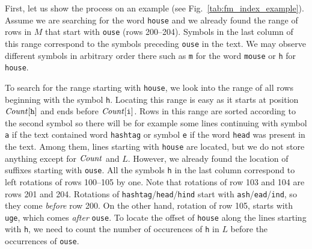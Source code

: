 First, let us show the process on an example (see Fig.~\ref{tab:fm_index_example}). Assume we are
searching for the word {\tt house} and we already found the range of rows in $M$ that start with
{\tt ouse} (rows 200--204). Symbols in the last column of this range correspond to the symbols
preceding {\tt ouse} in the text. We may observe different symbols in arbitrary order there such as
{\tt m} for the word {\tt mouse} or {\tt h} for {\tt house}.

To search for the range starting with {\tt house}, we look into the range of all rows beginning with the
symbol {\tt h}. Locating this range is easy as it starts at position $\mathit{Count}[\texttt{h}]$ and ends before
$\mathit{Count}[\texttt{i}]$. Rows in this range are sorted according to the second symbol so there will be for
example some lines continuing with symbol {\tt a} if the text contained word {\tt hashtag} or symbol {\tt e}
if the word {\tt head} was present in the text. Among them, lines starting with {\tt house} are located,
but we do not store anything except for $\mathit{Count}$ and $L$. However, we already found the location of
suffixes starting with {\tt ouse}. All the symbols {\tt h} in the last column correspond to left rotations
of rows 100--105 by one. Note that rotations of row 103 and 104 are rows 201 and 204. Rotations of
\texttt{hashtag}/\texttt{head}/\texttt{hind} start with \texttt{ash}/\texttt{ead}/\texttt{ind}, so they
come \emph{before} row 200. On the other hand, rotation of row 105, starts with {\tt uge}, which comes
\emph{after} {\tt ouse}. To locate the offset of {\tt house} along the lines starting with {\tt h},
we need to count the number of occurences of {\tt h} in $L$ before the occurrences of {\tt ouse}.  


